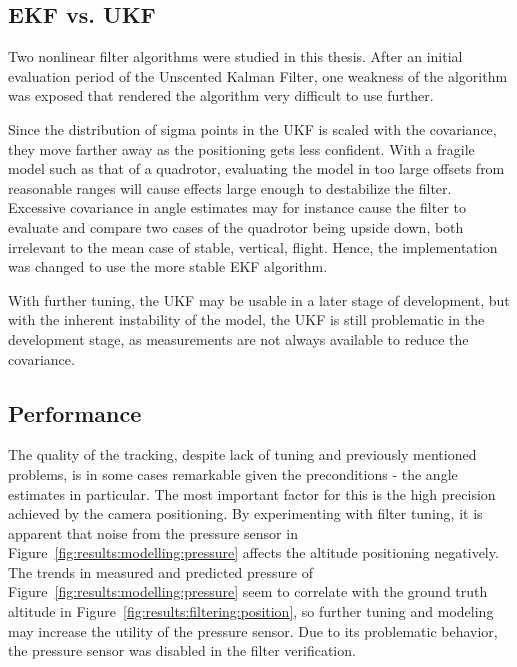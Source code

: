         \subsection{EKF vs. UKF}
            Two nonlinear filter algorithms were studied in this thesis.
            After an initial evaluation period of the Unscented Kalman Filter,
            one weakness of the algorithm was exposed that rendered the
            algorithm very difficult to use further.

            Since the distribution of sigma points in the UKF is scaled with
            the covariance, they move farther away as the positioning gets
            less confident.
            With a fragile model such as that of a quadrotor,
            evaluating the model in too large offsets from reasonable ranges
            will cause effects large enough to destabilize the filter.
            Excessive covariance in angle estimates may for instance
            cause the filter to evaluate and compare two cases of the quadrotor
            being upside down, both irrelevant to the mean case of stable, vertical, flight.
            Hence, the implementation was changed to use the more stable EKF algorithm.

            With further tuning, the UKF may be usable in a later stage 
            of development, but with the inherent instability of the model, 
            the UKF is still problematic in the development stage, 
            as measurements are not always available to reduce the covariance.

        \subsection{Performance}
            The quality of the tracking, despite lack of tuning and previously
            mentioned problems, is in some cases remarkable given the
            preconditions - the angle estimates in particular.
            The most important factor for this is the high precision achieved by the
            camera positioning. By experimenting with filter tuning, it
            is apparent that noise from the pressure sensor
            in Figure~\ref{fig:results:modelling:pressure} affects the 
            altitude positioning negatively. 
            The trends in measured and predicted pressure of Figure~\ref{fig:results:modelling:pressure}
            seem to correlate with the ground truth altitude in Figure~\ref{fig:results:filtering:position},
            so further tuning and modeling may increase the utility of the pressure sensor.
            Due to its problematic behavior, the pressure sensor was disabled in the filter verification.

